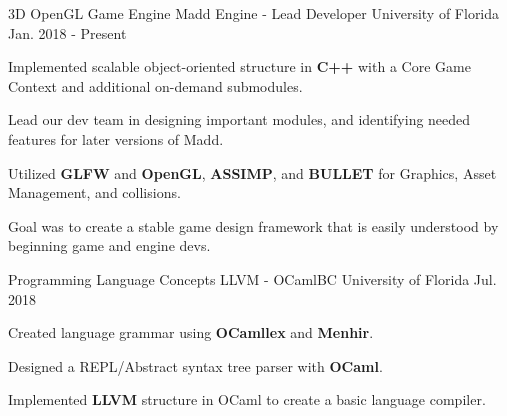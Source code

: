 \begin{cventries}
	
	\cventry
	{3D OpenGL Game Engine} %
	{Madd Engine - Lead Developer} %
	{University of Florida} %
	{Jan. 2018 - Present} %
	{ %
		\begin{cvitems}
			\setlength{\itemindent}{.125in}
			\item {Implemented scalable object-oriented structure in \textbf{C++} with a Core Game Context and additional on-demand submodules.}
			\item {Lead our dev team in designing important modules, and identifying needed features for later versions of Madd.}
			\item {Utilized \textbf{GLFW} and \textbf{OpenGL}, \textbf{ASSIMP}, and \textbf{BULLET} for Graphics, Asset Management, and collisions.}
			\item {Goal was to create a stable game design framework that is easily understood by beginning game and engine devs.}
		\end{cvitems}
	}
	
	
	\cventry
	{Programming Language Concepts} %
	{LLVM - OCamlBC} %
	{University of Florida} %
	{Jul. 2018} %
	{ %
		\begin{cvitems}
			\setlength{\itemindent}{.125in}
			\item {Created language grammar using \textbf{OCamllex} and \textbf{Menhir}.}
			\item {Designed a REPL/Abstract syntax tree parser with \textbf{OCaml}.}
			\item {Implemented \textbf{LLVM} structure in OCaml to create a basic language compiler.}
		\end{cvitems}
	}

	
\end{cventries}
